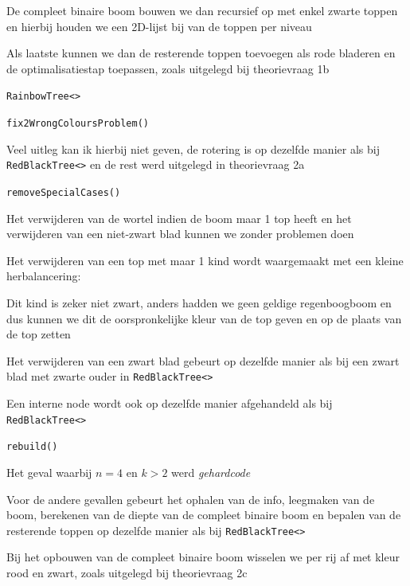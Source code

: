 \documentclass{article}
\def\code#1{\texttt{#1}}
\begin{document}
De compleet binaire boom bouwen we dan recursief op met enkel zwarte toppen en hierbij houden we een 2D-lijst bij van de toppen per niveau

Als laatste kunnen we dan de resterende toppen toevoegen als rode bladeren en de optimalisatiestap toepassen, zoals uitgelegd bij theorievraag 1b

\vspace{0.5cm}

\Large \code{RainbowTree<>}

\vspace{0.3cm}

\large

\code{fix2WrongColoursProblem()}

Veel uitleg kan ik hierbij niet geven, de rotering is op dezelfde manier als bij \code{RedBlackTree<>} en de rest werd uitgelegd in theorievraag 2a

\vspace{0.2cm}

\code{removeSpecialCases()}

Het verwijderen van de wortel indien de boom maar 1 top heeft en het verwijderen van een niet-zwart blad kunnen we zonder problemen doen

Het verwijderen van een top met maar 1 kind wordt waargemaakt met een kleine herbalancering:

Dit kind is zeker niet zwart, anders hadden we geen geldige regenboogboom en dus kunnen we dit de oorspronkelijke kleur van de top geven en op de plaats van de top zetten

Het verwijderen van een zwart blad gebeurt op dezelfde manier als bij een zwart blad met zwarte ouder in \code{RedBlackTree<>}

Een interne node wordt ook op dezelfde manier afgehandeld als bij \code{RedBlackTree<>}

\vspace{0.2cm}

\code{rebuild()}

Het geval waarbij $n = 4$ en $k > 2$ werd \textit{gehardcode}

Voor de andere gevallen gebeurt het ophalen van de info, leegmaken van de boom, berekenen van de diepte van de compleet binaire boom en bepalen van de resterende toppen op dezelfde manier als bij \code{RedBlackTree<>}

Bij het opbouwen van de compleet binaire boom wisselen we per rij af met kleur rood en zwart, zoals uitgelegd bij theorievraag 2c
\end{document}
